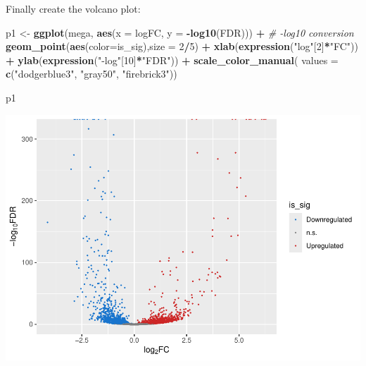 \documentclass[
]{book}
\newenvironment{Shaded}{\begin{snugshade}}{\end{snugshade}}
\newcommand{\AttributeTok}[1]{\textcolor[rgb]{0.13,0.29,0.53}{#1}}
\newcommand{\CommentTok}[1]{\textcolor[rgb]{0.56,0.35,0.01}{\textit{#1}}}
\newcommand{\DecValTok}[1]{\textcolor[rgb]{0.00,0.00,0.81}{#1}}
\newcommand{\FunctionTok}[1]{\textcolor[rgb]{0.13,0.29,0.53}{\textbf{#1}}}
\newcommand{\NormalTok}[1]{#1}
\newcommand{\OtherTok}[1]{\textcolor[rgb]{0.56,0.35,0.01}{#1}}
\newcommand{\SpecialCharTok}[1]{\textcolor[rgb]{0.81,0.36,0.00}{\textbf{#1}}}
\newcommand{\StringTok}[1]{\textcolor[rgb]{0.31,0.60,0.02}{#1}}
\begin{document}
Finally create the volcano plot:

\begin{Shaded}
\begin{Highlighting}[]
\NormalTok{p1 }\OtherTok{\textless{}{-}} \FunctionTok{ggplot}\NormalTok{(mega, }
    \FunctionTok{aes}\NormalTok{(}\AttributeTok{x =}\NormalTok{ logFC, }\AttributeTok{y =} \SpecialCharTok{{-}}\FunctionTok{log10}\NormalTok{(FDR))) }\SpecialCharTok{+} \CommentTok{\# {-}log10 conversion  }
    \FunctionTok{geom\_point}\NormalTok{(}\FunctionTok{aes}\NormalTok{(}\AttributeTok{color=}\NormalTok{is\_sig),}\AttributeTok{size =} \DecValTok{2}\SpecialCharTok{/}\DecValTok{5}\NormalTok{) }\SpecialCharTok{+}  
    \FunctionTok{xlab}\NormalTok{(}\FunctionTok{expression}\NormalTok{(}\StringTok{"log"}\NormalTok{[}\DecValTok{2}\NormalTok{]}\SpecialCharTok{*}\StringTok{"FC"}\NormalTok{)) }\SpecialCharTok{+} 
    \FunctionTok{ylab}\NormalTok{(}\FunctionTok{expression}\NormalTok{(}\StringTok{"{-}log"}\NormalTok{[}\DecValTok{10}\NormalTok{]}\SpecialCharTok{*}\StringTok{"FDR"}\NormalTok{)) }\SpecialCharTok{+} 
    \FunctionTok{scale\_color\_manual}\NormalTok{(}
        \AttributeTok{values =} \FunctionTok{c}\NormalTok{(}\StringTok{"dodgerblue3"}\NormalTok{, }\StringTok{"gray50"}\NormalTok{, }\StringTok{"firebrick3"}\NormalTok{)) }

\NormalTok{p1}
\end{Highlighting}
\end{Shaded}

\includegraphics{_main_files/figure-latex/unnamed-chunk-117-1.pdf}

  
\end{document}
